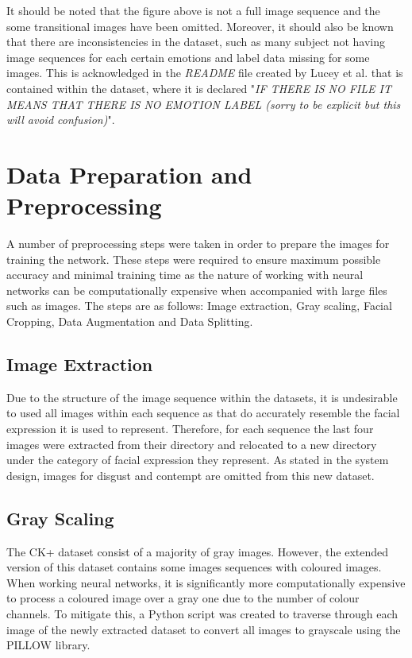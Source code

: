 It should be noted that the figure above is not a full image sequence and the some transitional images have been omitted. Moreover, it should also be known that there are inconsistencies in the dataset, such as many subject not having image sequences for each certain emotions and label data missing for some images. This is acknowledged in the \textit{README} file created by Lucey et al. that is contained within the dataset, where it is declared "\textit{IF THERE IS NO FILE IT MEANS THAT THERE IS NO EMOTION LABEL (sorry to be explicit but this will avoid confusion)}". 

\section{Data Preparation and Preprocessing}
A number of preprocessing steps were taken in order to prepare the images for training the network. These steps were required to ensure maximum possible accuracy and minimal training time as the nature of working with neural networks can be computationally expensive when accompanied with large files such as images. The steps are as follows: Image extraction, Gray scaling, Facial Cropping, Data Augmentation and Data Splitting.

\subsection{Image Extraction}
Due to the structure of the image sequence within the datasets, it is undesirable to used all images within each sequence as that do accurately resemble the facial expression it is used to represent. Therefore, for each sequence the last four images were extracted from their directory and relocated to a new directory under the category of facial expression they represent. As stated in the system design, images for disgust and contempt are omitted from this new dataset.

\subsection{Gray Scaling}
The CK+ dataset consist of a majority of gray images. However, the extended version of this dataset contains some images sequences with coloured images. When working neural networks, it is significantly more computationally expensive to process a coloured image over a gray one due to the number of colour channels. To mitigate this, a Python script was created to traverse through each image of the newly extracted dataset to convert all images to grayscale using the PILLOW library. \\

